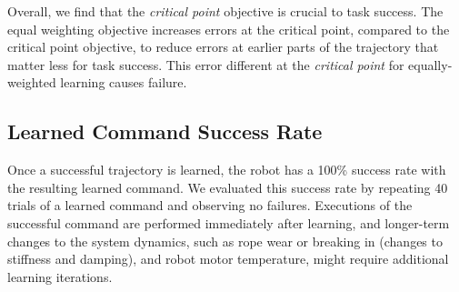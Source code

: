 \documentclass[conference]{IEEEtran}
\begin{document}

Overall, we find that the \textit{critical point} objective is crucial to task success. The equal weighting objective increases errors at the critical point, compared to the critical point objective, to reduce errors at earlier parts of the trajectory that matter less for task success. This error different at the \textit{critical point} for equally-weighted learning causes failure.




\subsection{Learned Command Success Rate}
Once a successful trajectory is learned, the robot has a 100\% success rate with the resulting learned command. We evaluated this success rate by repeating 40 trials of a learned command and observing no failures. Executions of the successful command are performed immediately after learning, and longer-term changes to the system dynamics, such as rope wear or breaking in (changes to stiffness and damping), and robot motor temperature, might require additional learning iterations.
\end{document}
